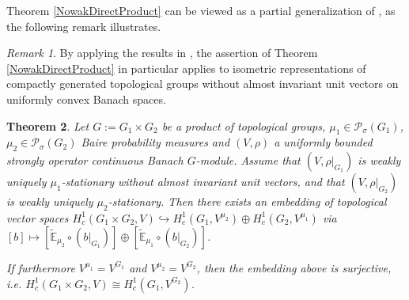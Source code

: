 \documentclass[a4paper,11pt,reqno]{amsart}
\numberwithin{equation}{section}
\newtheorem{theorem}{Theorem}[section]
\theoremstyle{definition}
\theoremstyle{remark}
\theoremstyle{remark}
\newtheorem{remark}[theorem]{Remark}
\begin{document}
Theorem \ref{NowakDirectProduct} can be viewed as a partial generalization of \cite[Theorem C]{BaderFurmanGelanderMonod}, as the following remark illustrates.

\begin{remark} \label{UniformlyConvexExample} By applying the results in \cite{DrutuNowak19}, the assertion of Theorem \ref{NowakDirectProduct} in particular applies to isometric representations of compactly generated topological groups without almost invariant unit vectors on uniformly convex Banach spaces. \end{remark}

\begin{theorem} \label{WeaklyProductDecomposition} Let $G:=G_{1}\times G_{2}$ be a product of topological groups, $\mu_{1}\in\mathcal{P}_{\sigma}(G_{1})$, $\mu_{2}\in\mathcal{P}_{\sigma}(G_{2})$ Baire probability measures and $(V,\rho)$ a uniformly bounded strongly operator continuous Banach $G$-module. Assume that $(V,\rho|_{G_{1}})$ is weakly uniquely $\mu_{1}$-stationary without almost invariant unit vectors, and that $(V,\rho|_{G_{2}})$ is weakly uniquely $\mu_{2}$-stationary. Then there exists an embedding of topological vector spaces $H_{c}^{1}(G_{1}\times G_{2},V)\hookrightarrow H_{c}^{1}(G_{1},V^{\mu_{2}})\oplus H_{c}^{1}(G_{2},V^{\mu_{1}})$ via $[b]\mapsto[\widetilde{\mathbb{E}}_{\mu_{2}}\circ(b|_{G_{1}})]\oplus[\widetilde{\mathbb{E}}_{\mu_{1}}\circ(b|_{G_{2}})]$.

If furthermore $V^{\mu_{1}}=V^{G_{1}}$ and $V^{\mu_{2}}=V^{G_{2}}$, then the embedding above is surjective, i.e. $H_{c}^{1}(G_{1}\times G_{2},V)\cong H_{c}^{1}(G_{1},V^{G_{2}})$. \end{theorem}
\end{document}
